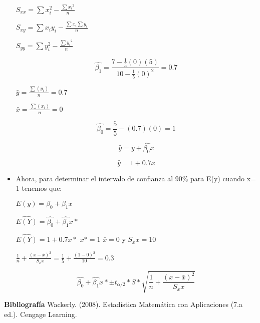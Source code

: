 \documentclass{../oxmathproblems}
\begin{document}
\begin{questions}
\begin{itemize}
$ S_{xx} = \sum{x_i^2} - \frac{\sum{x_i}^2}{n}$  

$ S_{xy} = \sum{x_iy_i} - \frac{\sum{x_i}\sum{y_i}}{n} $

$ S_{yy} = \sum{y_i^2} - \frac{\sum{y_i}^2}{n}$  

$$ \hat{\beta_1} = \frac{7- \frac{1}{5}(0)(5)}{10- \frac{1}{5}(0)^2} = 0.7  
$$ 


$ \bar{y} = \frac{\sum(y_i)}{n} = 0.7 $

$ \bar{x} = \frac{\sum(x_i)}{n} =  0 $ 

$$
\hat{\beta_0} = \frac{5}{5} - (0.7)(0) = 1 
$$ 


$$ \hat{y} = \bar{y} +\hat{\beta_0}x $$ 

$$  \hat{y} = 1 + 0.7x $$ 

\item Ahora, para determinar el intervalo de confianza al 90$\%$ para E(y) cuando x= 1 tenemos que: 

$ E(y) = \beta_0 + \beta_1x$ 

$ \hat{E(Y)} = \hat{\beta_0} + \hat{\beta_1}x* $  

$ \hat{E(Y)} = 1+ 0.7x* $ 
 $ x* = 1$  $\bar{x} = 0 $ y $S_xx = 10 $ 



$ \frac{1}{n} + \frac{(x-\bar{x})^2}{S_xx} = \frac{1}{5} + \frac{(1-0)^2}{10} = 0.3 $



$$ 
\hat{\beta_0} + \hat{\beta_1}x* \pm t_{\alpha/2} *S* \sqrt {\frac{1}{n} + \frac{(x-\bar{x})^2}{S_xx}}
$$ 


\end{itemize}


\textbf{Bibliografía}
Wackerly. (2008). Estadística Matemática con Aplicaciones (7.a ed.). Cengage Learning.


\end{questions}
\end{document}
